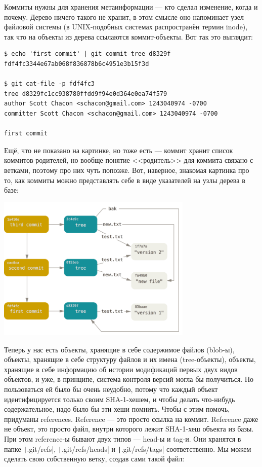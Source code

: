 \documentclass{../../text-style}
\begin{document}
Коммиты нужны для хранения метаинформации --- кто сделал изменение, когда и почему. Дерево ничего такого не хранит, в этом смысле оно напоминает узел файловой системы (в UNIX-подобных системах распространён термин inode), так что на объекты из дерева ссылаются коммит-объекты. Вот так это выглядит:
\begin{verbatim}
$ echo 'first commit' | git commit-tree d8329f
fdf4fc3344e67ab068f836878b6c4951e3b15f3d

$ git cat-file -p fdf4fc3
tree d8329fc1cc938780ffdd9f94e0d364e0ea74f579
author Scott Chacon <schacon@gmail.com> 1243040974 -0700
committer Scott Chacon <schacon@gmail.com> 1243040974 -0700

first commit
\end{verbatim}

Ещё, что не показано на картинке, но тоже есть --- коммит хранит список коммитов-родителей, но вообще понятие <<родитель>> для коммита связано с ветками, поэтому про них чуть попозже. Вот, наверное, знакомая картинка про то, как коммиты можно представлять себе в виде указателей на узлы дерева в базе:

\begin{center}
    \includegraphics[width=0.7\textwidth]{gitCommitObjects.png}
\end{center}

Теперь у нас есть объекты, хранящие в себе содержимое файлов (blob-ы), объекты, хранящие в себе структуру файлов и их имена (tree-объекты), объекты, хранящие в себе информацию об истории модификаций первых двух видов объектов, и уже, в принципе, система контроля версий могла бы получиться. Но пользоваться ей было бы очень неудобно, потому что каждый объект идентифицируется только своим SHA-1-хешем, и чтобы делать что-нибудь содержательное, надо было бы эти хеши помнить. Чтобы с этим помочь, придуманы references. Reference --- это просто ссылка на коммит. Reference даже не объект, это просто файл, внутри которого лежит SHA-1-хеш объекта из базы. При этом reference-ы бывают двух типов --- head-ы и tag-и. Они хранятся в папке \texttt|.git/refs|, \texttt|.git/refs/heads| и \texttt|.git/refs/tags| соответственно. Мы можем сделать свою собственную ветку, создав сами такой файл:
\end{document}
